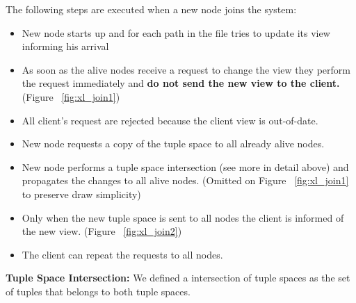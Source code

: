 \documentclass[times, 10pt,twocolumn]{article}
\begin{document}



The following steps are executed when a new node joins the system:
\begin{itemize}
   \item New node starts up and for each path in the file tries to update its view informing his arrival
   \item As soon as the alive nodes receive a request to change the view they perform the request
   immediately and \textbf{do not send the new view to the client.} (Figure ~\ref{fig:xl_join1})
   \item All client's request are rejected because the client view is out-of-date.
   \item New node requests a copy of the tuple space to all already alive nodes.
   \item New node performs a tuple space intersection (see more in detail above) and propagates the changes
   to all alive nodes. (Omitted on Figure ~\ref{fig:xl_join1} to preserve draw simplicity)
   \item Only when the new tuple space is sent to all nodes the client is informed of the new view. (Figure ~\ref{fig:xl_join2})
   \item The client can repeat the requests to all nodes.   
\end{itemize}

\textbf{Tuple Space Intersection:} We defined a intersection of tuple spaces as the set of tuples
that belongs to both tuple spaces.
\end{document}
